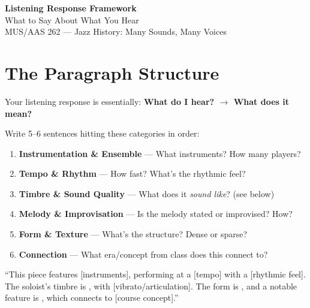 \documentclass[11pt,letterpaper]{article}
\begin{document}
\begin{center}
{\Huge\bfseries\textcolor{headerblue}{Listening Response Framework}}\\[0.3em]
{\Large What to Say About What You Hear}\\[0.5em]
{\large MUS/AAS 262 --- Jazz History: Many Sounds, Many Voices}
\end{center}

\vspace{0.5em}

\section{The Paragraph Structure}

Your listening response is essentially: \textbf{What do I hear? $\rightarrow$ What does it mean?}

Write 5--6 sentences hitting these categories in order:

\begin{enumerate}[leftmargin=1.5em, itemsep=0.3em]
  \item \textbf{Instrumentation \& Ensemble} --- What instruments? How many players?
  \item \textbf{Tempo \& Rhythm} --- How fast? What's the rhythmic feel?
  \item \textbf{Timbre \& Sound Quality} --- What does it \emph{sound like}? (see below)
  \item \textbf{Melody \& Improvisation} --- Is the melody stated or improvised? How?
  \item \textbf{Form \& Texture} --- What's the structure? Dense or sparse?
  \item \textbf{Connection} --- What era/concept from class does this connect to?
\end{enumerate}

\begin{tcolorbox}[examplebox, title={Template sentence}]
``This piece features \underline{\hspace{2cm}} [instruments], performing at a \underline{\hspace{2cm}} [tempo] with a \underline{\hspace{2cm}} [rhythmic feel]. The soloist's timbre is \underline{\hspace{2cm}}, with \underline{\hspace{2cm}} [vibrato/articulation]. The form is \underline{\hspace{2cm}}, and a notable feature is \underline{\hspace{2cm}}, which connects to \underline{\hspace{2cm}} [course concept].''
\end{tcolorbox}
\end{document}
